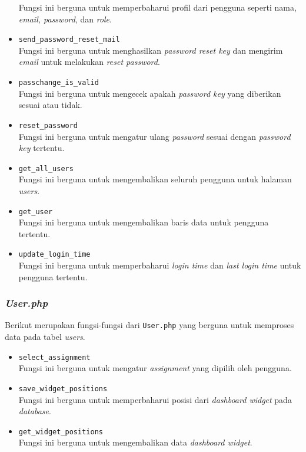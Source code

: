 \begin{itemize}
	Fungsi ini berguna untuk memperbaharui profil dari pengguna seperti nama, \textit{email, password}, dan \textit{role}.
	\item \texttt{send\_password\_reset\_mail}\\
	Fungsi ini berguna untuk menghasilkan \textit{password reset key} dan mengirim \textit{email} untuk melakukan \textit{reset password}.
	\item \texttt{passchange\_is\_valid}\\
	Fungsi ini berguna untuk mengecek apakah \textit{password key} yang diberikan sesuai atau tidak.
	\item \texttt{reset\_password}\\
	Fungsi ini berguna untuk mengatur ulang \textit{password} sesuai dengan \textit{password key} tertentu.
	\item \texttt{get\_all\_users}\\
	Fungsi ini berguna untuk mengembalikan seluruh pengguna untuk halaman \textit{users}.
	\item \texttt{get\_user}\\
	Fungsi ini berguna untuk mengembalikan baris data untuk pengguna tertentu.
	\item \texttt{update\_login\_time}\\
	Fungsi ini berguna untuk memperbaharui \textit{login time} dan \textit{last login time} untuk pengguna tertentu.
\end{itemize}
\subsubsection{\textit{User.php}}
Berikut merupakan fungsi-fungsi dari \texttt{User.php} yang berguna untuk memproses data pada tabel \textit{users}.
\begin{itemize}
	\item \texttt{select\_assignment}\\
	Fungsi ini berguna untuk mengatur \textit{assignment} yang dipilih oleh pengguna.
	\item \texttt{save\_widget\_positions}\\
	Fungsi ini berguna untuk memperbaharui posisi dari \textit{dashboard widget} pada \textit{database}.
	\item \texttt{get\_widget\_positions}\\
	Fungsi ini berguna untuk mengembalikan data \textit{dashboard widget}.
\end{itemize}


